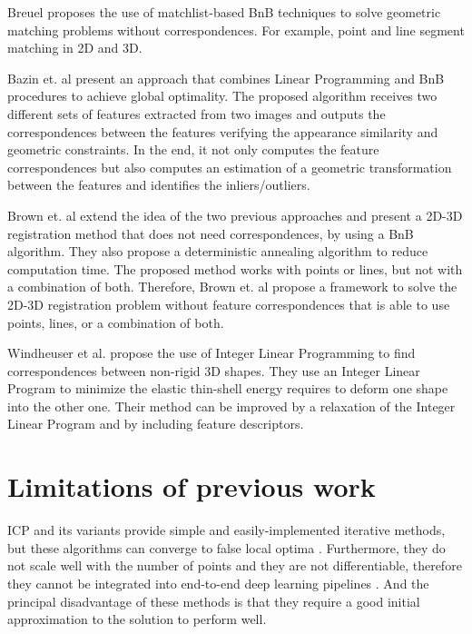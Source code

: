     Breuel \cite{Breuel_2003_implementation} proposes the use of matchlist-based BnB techniques to solve geometric matching problems without correspondences.
    For example, point and line segment matching in 2D and 3D.

    Bazin et. al \cite{Bazin_2013_abranchandbound} present an approach that combines Linear Programming and BnB procedures to achieve global optimality.
    The proposed algorithm receives two different sets of features extracted from two images and outputs
    the correspondences between the features verifying the appearance similarity and geometric constraints.
    In the end, it not only computes the feature correspondences but also computes an estimation of a geometric transformation between the features
    and identifies the inliers/outliers.

    Brown et. al \cite{Brown_2015_globally} extend the idea of the two previous approaches and present a 2D-3D registration method that does not need
    correspondences, by using a BnB algorithm. They also propose a deterministic annealing algorithm to reduce computation time.
    The proposed method works with points or lines, but not with a combination of both.
    Therefore, Brown et. al \cite{Brown_2019_afamily} propose a framework to solve the 2D-3D registration problem without feature correspondences
    that is able to use points, lines, or a combination of both.

    Windheuser et al. \cite{Windheuser_2011_largescale} propose the use of Integer Linear Programming to find correspondences between non-rigid 3D shapes.
    They use an Integer Linear Program to minimize the elastic thin-shell energy requires to deform one shape into the other one.
    Their method can be improved by a relaxation of the Integer Linear Program and by including feature descriptors.

    \section{Limitations of previous work}
    ICP and its variants provide simple and easily-implemented iterative methods, but these algorithms can converge to false local optima \cite{Wang_2019_deepclosest}.
    Furthermore, they do not scale well with the number of points and they are not differentiable, therefore they cannot be integrated into end-to-end
    deep learning pipelines \cite{Sarode_2019_oneframework}. 
    And the principal disadvantage of these methods is that they require a good initial approximation to the solution to perform well.
    
